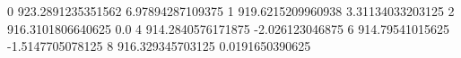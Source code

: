 0 923.2891235351562 6.97894287109375
1 919.6215209960938 3.31134033203125
2 916.3101806640625 0.0
4 914.2840576171875 -2.026123046875
6 914.79541015625 -1.5147705078125
8 916.329345703125 0.0191650390625
